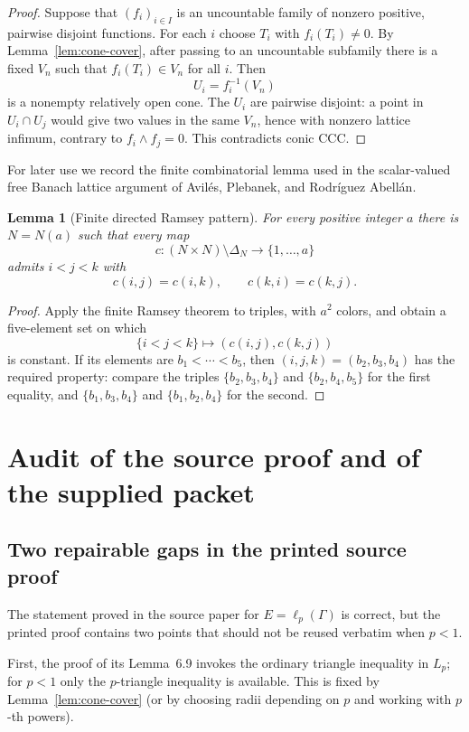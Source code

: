 \documentclass[11pt]{article}
\newtheorem{lemma}[theorem]{Lemma}
\theoremstyle{definition}
\begin{document}
\begin{proof}
Suppose that $(f_i)_{i\in I}$ is an uncountable family of nonzero positive,
pairwise disjoint functions.  For each $i$ choose $T_i$ with $f_i(T_i)\neq0$.
By Lemma~\ref{lem:cone-cover}, after passing to an uncountable subfamily there
is a fixed $V_n$ such that $f_i(T_i)\in V_n$ for all $i$.  Then
\[
 U_i=f_i^{-1}(V_n)
\]
is a nonempty relatively open cone.  The $U_i$ are pairwise disjoint: a point
in $U_i\cap U_j$ would give two values in the same $V_n$, hence with nonzero
lattice infimum, contrary to $f_i\wedge f_j=0$.  This contradicts conic CCC.
\end{proof}

For later use we record the finite combinatorial lemma used in the scalar-valued
free Banach lattice argument of Avil\'es, Plebanek, and Rodr\'iguez Abell\'an.

\begin{lemma}[Finite directed Ramsey pattern]
\label{lem:ramsey}
For every positive integer $a$ there is $N=N(a)$ such that every map
\[
 c:(N\times N)\setminus\Delta_N\longrightarrow\{1,\ldots,a\}
\]
admits $i<j<k$ with
\[
 c(i,j)=c(i,k),\qquad c(k,i)=c(k,j).
\]
\end{lemma}

\begin{proof}
Apply the finite Ramsey theorem to triples, with $a^2$ colors, and obtain a
five-element set on which
\[
 \{i<j<k\}\longmapsto(c(i,j),c(k,j))
\]
is constant.  If its elements are $b_1<\cdots<b_5$, then
$(i,j,k)=(b_2,b_3,b_4)$ has the required property: compare the triples
$\{b_2,b_3,b_4\}$ and $\{b_2,b_4,b_5\}$ for the first equality, and
$\{b_1,b_3,b_4\}$ and $\{b_1,b_2,b_4\}$ for the second.
\end{proof}

\section{Audit of the source proof and of the supplied packet}

\subsection{Two repairable gaps in the printed source proof}

The statement proved in the source paper for $E=\ell_p(\Gamma)$ is correct,
but the printed proof contains two points that should not be reused verbatim
when $p<1$.

First, the proof of its Lemma~6.9 invokes the ordinary triangle inequality in
$L_p$; for $p<1$ only the $p$-triangle inequality is available.  This is fixed by
Lemma~\ref{lem:cone-cover} (or by choosing radii depending on $p$ and working
with $p$-th powers).
\end{document}
